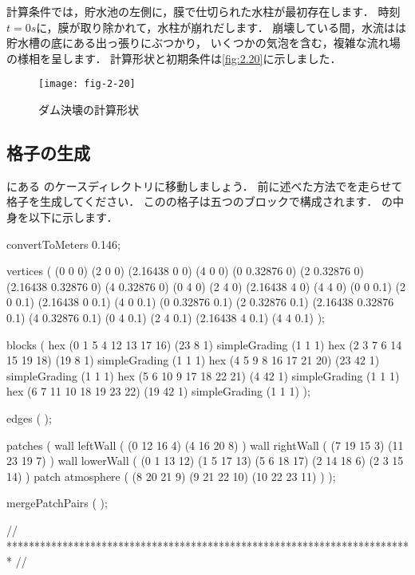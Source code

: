 計算条件では，貯水池の左側に，膜で仕切られた水柱が最初存在します．
時刻$t = 0\unit{s}$に，膜が取り除かれて，水柱が崩れだします．
崩壊している間，水流はは貯水槽の底にある出っ張りにぶつかり，
いくつかの気泡を含む，複雑な流れ場の様相を呈します．
計算形状と初期条件は\autoref{fig:2.20}に示しました．


\begin{figure}[ht]
 \texttt{[image: fig-2-20]}
 \caption{ダム決壊の計算形状}
 \label{fig:2.20}
\end{figure}


\subsection{格子の生成}
\label{ssec:2.3.1}
にある
のケースディレクトリに移動しましょう．
前に述べた方法でを走らせて格子を生成してください．
このの格子は五つのブロックで構成されます．
の中身を以下に示します．
\begin{OFverbatim}[file, linenum=17]

convertToMeters 0.146;

vertices        
(
    (0 0 0)
    (2 0 0)
    (2.16438 0 0)
    (4 0 0)
    (0 0.32876 0)
    (2 0.32876 0)
    (2.16438 0.32876 0)
    (4 0.32876 0)
    (0 4 0)
    (2 4 0)
    (2.16438 4 0)
    (4 4 0)
    (0 0 0.1)
    (2 0 0.1)
    (2.16438 0 0.1)
    (4 0 0.1)
    (0 0.32876 0.1)
    (2 0.32876 0.1)
    (2.16438 0.32876 0.1)
    (4 0.32876 0.1)
    (0 4 0.1)
    (2 4 0.1)
    (2.16438 4 0.1)
    (4 4 0.1)
);

blocks          
(
    hex (0 1 5 4 12 13 17 16) (23 8 1) simpleGrading (1 1 1)
    hex (2 3 7 6 14 15 19 18) (19 8 1) simpleGrading (1 1 1)
    hex (4 5 9 8 16 17 21 20) (23 42 1) simpleGrading (1 1 1)
    hex (5 6 10 9 17 18 22 21) (4 42 1) simpleGrading (1 1 1)
    hex (6 7 11 10 18 19 23 22) (19 42 1) simpleGrading (1 1 1)
);

edges           
(
);

patches         
(
    wall leftWall 
    (
        (0 12 16 4)
        (4 16 20 8)
    )
    wall rightWall 
    (
        (7 19 15 3)
        (11 23 19 7)
    )
    wall lowerWall 
    (
        (0 1 13 12)
        (1 5 17 13)
        (5 6 18 17)
        (2 14 18 6)
        (2 3 15 14)
    )
    patch atmosphere 
    (
        (8 20 21 9)
        (9 21 22 10)
        (10 22 23 11)
    )
);

mergePatchPairs
(
);

// ************************************************************************* //
\end{OFverbatim}


